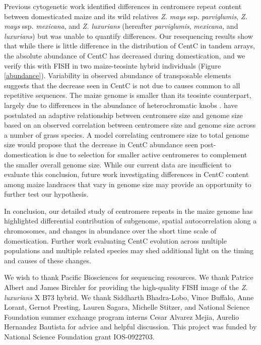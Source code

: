 Previous cytogenetic work  identified  differences in centromere repeat content  between domesticated maize and its wild relatives \emph{Z. mays} ssp. \emph{parviglumis}, \emph{Z. mays} ssp. \emph{mexicana}, and \emph{Z. luxurians} (hereafter \emph{parviglumis}, \emph{mexicana,} and \emph{luxurians}) \citep{Albert2010} but was unable to quantify  differences. 
Our resequencing results show that while there is little difference in the distribution of CentC in tandem arrays, the absolute abundance of CentC has  decreased during domestication, and we verify this with FISH in two maize-teosinte hybrid individuals (Figure \ref{abundance}). 
Variability in observed abundance of transposable elements \citep{Chia2012} suggests that the decrease seen in CentC is not due to causes common to all repetitive sequences.
The maize genome is smaller than its teosinte counterpart, largely due to differences in the abundance of heterochromatic knobs \citep{poggio1998}.  \citet{Zhang2012} have postulated an adaptive relationship between centromere size and genome size based on an observed correlation between centromere size and genome size across a number of grass species.  
A model correlating centromere size to total genome size would propose that the decrease in CentC abundance seen post-domestication is due to selection for smaller active centromeres to complement the smaller overall genome size.
While our current data are insufficient to evaluate this conclusion, future work investigating differences in CentC content among maize landraces that vary in genome size \citep{poggio1998} may provide an opportunity to further test our hypothesis.  

In conclusion, our detailed study of centromere repeats in the maize genome has highlighted differential contribution of subgenome, spatial autocorrelation along a chromosomes, and changes in abundance over the short time scale of domestication.  Further work evaluating CentC evolution across multiple populations and multiple related species may shed additional light on the timing and causes of these changes.  

\begin{acknowledgements}
We wish to thank Pacific Biosciences for sequencing resources.  We thank Patrice Albert and James Birchler for providing the high-quality FISH image of the \emph{Z. luxurians} X B73 hybrid.  We thank Siddharth Bhadra-Lobo, Vince Buffalo, Anne Lorant, Gernot Presting, Lauren Sagara, Michelle Stitzer, and National Science Foundation summer exchange program interns Cesar Alvarez Mejia, Aurelio Hernandez Bautista for advice and helpful discussion. This project was funded by National Science Foundation grant IOS-0922703.
\end{acknowledgements}

